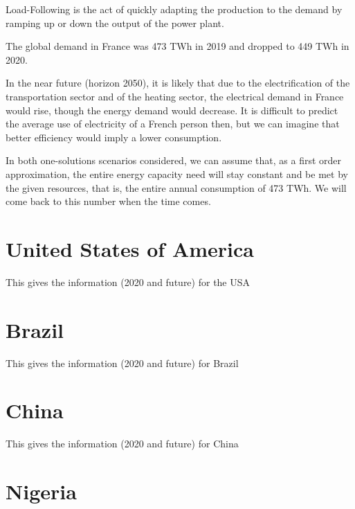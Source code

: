 \begin{kaobox}[frametitle=Load Follow]
Load-Following is the act of quickly adapting the production to the demand by ramping up or down the output of the power plant.
\end{kaobox}

The global demand in France was 473 TWh in 2019 and dropped to 449 TWh in 2020.


In the near future (horizon 2050), it is likely that due to the electrification of the transportation sector and of the heating sector, the electrical demand in France would rise, though the energy demand would decrease. It is difficult to predict the average use of electricity of a French person then, but we can imagine that better efficiency would imply a lower consumption.


In both one-solutions scenarios considered, we can assume that, as a first order approximation, the entire energy capacity need will stay constant and be met by the given resources, that is, the entire annual consumption of 473 TWh. We will come back to this number when the time comes.




\section{United States of America}

This gives the information (2020 and future) for the USA

\section{Brazil}

This gives the information (2020 and future) for Brazil

\section{China}

This gives the information (2020 and future) for China

\section{Nigeria}

